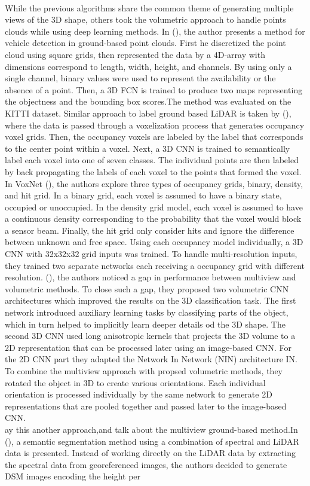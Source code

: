 \documentclass[final,3p,times,twocolumn,authoryear]{elsarticle}
\newcommand{\mxy}[1]{ \color{red}{#1}}
\begin{document}
\\While the previous algorithms share the common theme of generating multiple views of the 3D shape, others took the volumetric approach to handle points clouds while using deep learning methods. In (\cite{Bo_Li_iros}), the author presents a method for vehicle detection in ground-based point clouds. First he discretized the point cloud using square grids, then represented the data by a 4D-array with dimensions correspond to length, width, height, and channels. By using only a single channel, binary values were used to represent the availability or the absence of a point. Then, a 3D FCN is trained to produce two maps representing the objectness and the bounding box scores.The method was evaluated on the KITTI dataset. Similar approach to label ground based LiDAR is taken by (\cite{huang2016point}), where the data is passed through a voxelization process that generates occupancy voxel grids. Then, the occupancy voxels are labeled by the label that corresponds to the center point within a voxel. Next, a 3D CNN is trained to semantically label each voxel into one of seven classes. The individual points are then labeled by back propagating the labels of each voxel to the points that formed the voxel. In VoxNet (\cite{maturana2015voxnet}), the authors explore three types of occupancy grids, binary, density, and hit grid. In a binary grid, each voxel is assumed to have a binary state, occupied or unoccupied. In the density grid model, each voxel is assumed to have a continuous density corresponding to the probability that the voxel would block a sensor beam. Finally, the hit grid only consider hits and ignore the difference between unknown and free space. Using each occupancy model individually, a 3D CNN with 32x32x32 grid inputs was trained. To handle multi-resolution inputs, they trained two separate networks each receiving a occupancy grid with different resolution. (\cite{qi2016volumetric}), the authors noticed a gap in performance between multiview and volumetric methods. To close such a gap, they proposed two volumetric CNN architectures which improved the results on the 3D classification task. The first network introduced auxiliary learning tasks by classifying parts of the object, which in turn helped to implicitly learn deeper details od the 3D shape. The second 3D CNN used long anisotropic kernels that projects the 3D volume to a 2D representation that can be processed later using an image-based CNN. For the 2D CNN part they adapted the Network In Network (NIN) architecture {\mxy NIN}. To combine the multiview approach with propsed volumetric methods, they rotated the object in 3D to create various orientations. Each individual orientation is processed individually by the same network to generate 2D representations that are pooled together and passed later to the image-based CNN. \\{\mxy say this another approach,and talk about the multiview ground-based method.}In ({\cite{Yansong}}), a semantic segmentation method using a combination of spectral and LiDAR data is presented. Instead of working directly on the LiDAR data by extracting the spectral data from georeferenced images, the authors decided to generate DSM images encoding the height per 
\end{document}
